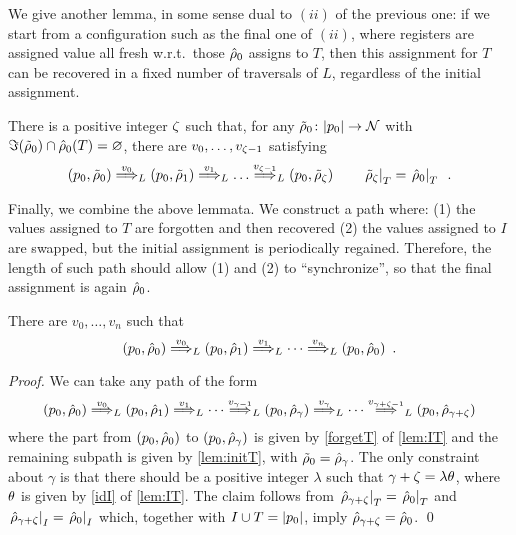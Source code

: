 %
\vspace{-5ex}
%
We give another lemma, in some sense dual to $(ii)$ of the previous one: if we start from a configuration such as the final one of $(ii)$, where registers are assigned value all fresh w.r.t.\ those $\hat{\rho}_0$ assigns to $T$, then this assignment for $T$ can be recovered in a fixed number of traversals of $L$, regardless of the initial assignment.

\begin{lemma}
There is a positive integer $\zeta$ such that,
for any $\tilde{\rho}_0 \colon |p_0| \to \mathcal{N}$ with $\Im(\tilde{\rho}_0) \cap \hat{\rho}_0(T) = \varnothing$, there are $v_0,\dots,v_{\zeta-1}$ satisfying
\[
	(p_0,\tilde{\rho}_0) \overset{v_0}{\Longrightarrow}_{L} (p_0,\tilde{\rho}_1) \overset{v_1}{\Longrightarrow}_{L} \dots \overset{v_{\zeta-1}}{\Longrightarrow}_{L} (p_0,\tilde{\rho}_\zeta)	
	\qquad
	\left.\tilde{\rho}_\zeta\right|_{T} = \left.\hat{\rho}_0\right|_{T} \enspace .
\]
\label{lem:initT}
\end{lemma}
%
\vspace{-4ex}
%
Finally, we combine the above lemmata. We construct a path where: (1) the values assigned to $T$ are forgotten and then recovered (2) the values assigned to $I$ are swapped, but the initial assignment is periodically regained. Therefore, the length of such path should allow (1) and (2) to ``synchronize'', so that the final assignment is again $\hat{\rho}_0$.

\begin{theorem}
\label{thm:loop}


There are $v_0,\dots,v_n$ such that
\[
	(p_0, \hat{\rho}_0) \overset{v_0}{\Longrightarrow}_{L} (p_0, \hat{\rho}_1) \overset{v_1}{\Longrightarrow}_{L} \cdots \overset{v_n}{\Longrightarrow}_{L} (p_0,\hat{\rho}_0) \enspace .
\]
\end{theorem}

\begin{proof}
We can take any path of the form
\[
	(p_0,\hat{\rho}_0) \overset{v_0}{\Longrightarrow}_{L} (p_0,\hat{\rho}_1) \overset{v_1}{\Longrightarrow}_{L} \cdots \overset{v_{\gamma-1}}{\Longrightarrow}_{L} (p_0,\hat{\rho}_\gamma) \overset{v_{\gamma}}{\Longrightarrow}_{L} \cdots \overset{v_{\gamma + \zeta - 1}}{\Longrightarrow}_{L} (p_0,\hat{\rho}_{\gamma + 
	 \zeta})
\]
where the part from $(p_0,\hat{\rho}_0)$ to $(p_0,\hat{\rho}_\gamma)$ is given by \eqref{forgetT} of \cref{lem:IT} and the remaining subpath is given by \cref{lem:initT}, with $\tilde{\rho}_0 = \hat{\rho}_\gamma$. The only constraint about $\gamma$ is that there should be a positive integer $\lambda$ such that $\gamma + \zeta = \lambda \theta$, where $\theta$ is given by \eqref{idI} of \cref{lem:IT}. The claim follows from $\left.\hat{\rho}_{\gamma + \zeta}\right|_{T} = \left.\hat{\rho}_0\right|_{T}$ and 
$\left.\hat{\rho}_{\gamma + \zeta}\right|_{I} = \left.\hat{\rho}_0\right|_{I}$ which, together with $I \cup T = |p_0|$, imply $\hat{\rho}_{\gamma + \zeta} = \hat{\rho}_0$.
\qed
\end{proof}
%

